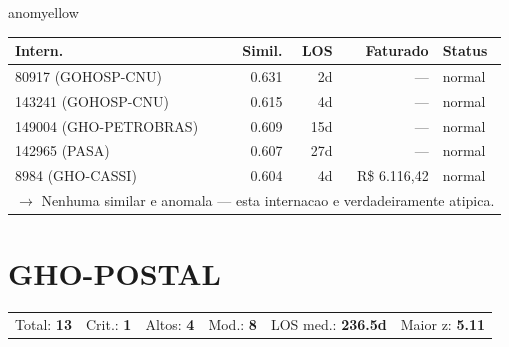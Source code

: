 \documentclass[a4paper,10pt]{article}
\begin{document}
\begin{anomalycard}[Internacao 161788 | GHO-PETROBRAS | MODERADO (z=2.01)]{anomyellow}
\begin{tabular}{l r r r l}\toprule\textbf{Intern.} & \textbf{Simil.} & \textbf{LOS} & \textbf{Faturado} & \textbf{Status} \\\midrule
80917 (GOHOSP-CNU) & 0.631 & 2d & --- & \textcolor{jcubeblue}{normal} \\
143241 (GOHOSP-CNU) & 0.615 & 4d & --- & \textcolor{jcubeblue}{normal} \\
149004 (GHO-PETROBRAS) & 0.609 & 15d & --- & \textcolor{jcubeblue}{normal} \\
142965 (PASA) & 0.607 & 27d & --- & \textcolor{jcubeblue}{normal} \\
8984 (GHO-CASSI) & 0.604 & 4d & R\$ 6.116,42 & \textcolor{jcubeblue}{normal} \\
\multicolumn{5}{l}{\textcolor{jcubeblue}{\small $\rightarrow$ Nenhuma similar e anomala --- esta internacao e verdadeiramente atipica.}} \\
\bottomrule\end{tabular}


\end{anomalycard}

\newpage

\clearpage
\section{GHO-POSTAL}
\begin{tcolorbox}[colback=lightblue,colframe=jcubeblue,title={\textbf{Resumo --- GHO-POSTAL}}]
\begin{tabular}{ll@{\quad}ll@{\quad}ll}
Total: \textbf{13} &
Crit.: \textcolor{anomred}{\textbf{1}} &
Altos: \textcolor{anomorange}{\textbf{4}} &
Mod.: \textcolor{anomyellow}{\textbf{8}} &
LOS med.: \textbf{236.5d} &
Maior z: \textbf{5.11} \\


\end{tabular}
\end{tcolorbox}
\end{document}
